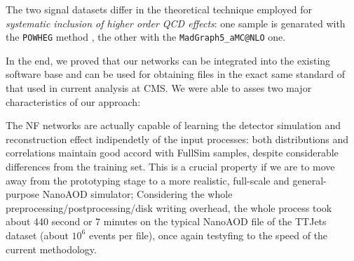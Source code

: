 \begin{figure}
\end{figure}

The two signal datasets differ in the theoretical technique employed for \emph{systematic inclusion of higher order QCD effects}: one sample is genarated with the \texttt{POWHEG} method \cite{Nason_2004}, the other with the \texttt{MadGraph5\_aMC@NLO} \cite{powpow} one.

In the end, we proved that our networks can be integrated into the existing software base and can be used for obtaining files in the exact same standard of that used in current analysis at CMS. We were able to asses two major characteristics of our approach:

\begin{outline}
    \1 The NF networks are actually capable of learning the detector simulation and reconstruction effect indipendetly of the input processes: both distributions and correlations maintain good accord with FullSim samples, despite considerable differences from the training set. This is a crucial property if we are to move away from the prototyping stage to a more realistic, full-scale and general-purpose NanoAOD simulator;
    \1 Considering the whole preprocessing/postprocessing/disk writing overhead, the whole process took about 440 second or 7 minutes on the typical NanoAOD file of the TTJets dataset (about $10^{6}$ events per file), once again testyfing to the speed of the current methodology.
\end{outline}